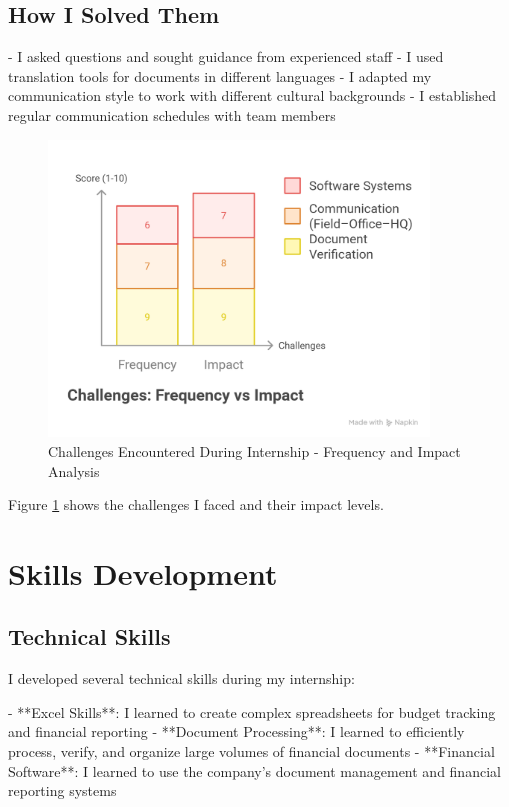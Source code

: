 \subsection{How I Solved Them}
- I asked questions and sought guidance from experienced staff
- I used translation tools for documents in different languages
- I adapted my communication style to work with different cultural backgrounds
- I established regular communication schedules with team members

\begin{figure}[H]
    \centering
    \includegraphics[width=0.9\textwidth]{assets/images/challenge_analysis_chart.png}
    \caption{Challenges Encountered During Internship - Frequency and Impact Analysis}
    \label{fig:challenge_analysis_chart}
\end{figure}

Figure \ref{fig:challenge_analysis_chart} shows the challenges I faced and their impact levels.

\section{Skills Development}

\subsection{Technical Skills}
I developed several technical skills during my internship:

- **Excel Skills**: I learned to create complex spreadsheets for budget tracking and financial reporting
- **Document Processing**: I learned to efficiently process, verify, and organize large volumes of financial documents
- **Financial Software**: I learned to use the company's document management and financial reporting systems

